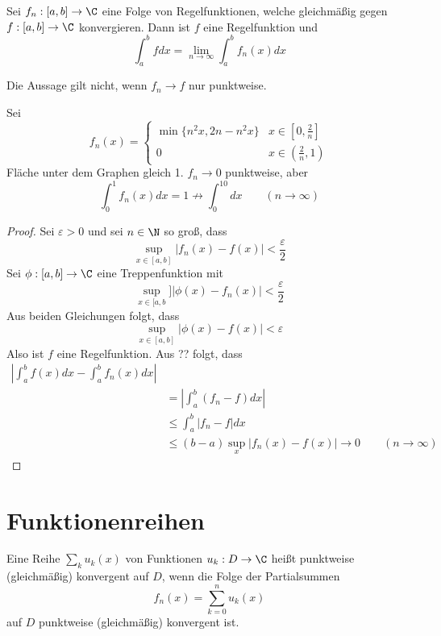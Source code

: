 \documentclass[a4paper,10pt]{scrbook}
\begin{document}
\begin{thm}
Sei $f_n:[a,b]\to\C$ eine Folge von Regelfunktionen, welche gleichmäßig gegen $f:[a,b]\to\C$ konvergieren. Dann ist $f$ eine Regelfunktion und
\[
\int_a^bfdx=\lim_{n\to\infty}\int_a^bf_n(x)dx
\]
\begin{note}
Die Aussage gilt nicht, wenn $f_n\to f$ nur punktweise.
\end{note}
\begin{ex*}
Sei
\[
f_n(x)=\begin{cases}
\min\{n^2x,2n-n^2x\}&x\in[0,\frac 2n]\\
0&x\in (\frac 2n, 1)
\end{cases}
\]
Fläche unter dem Graphen gleich 1. $f_n\to 0$ punktweise, aber
\[
\int_0^1f_n(x)dx=1\not\to \int_0^10dx \qquad (n\to\infty)
\]
\end{ex*}
\begin{proof}
Sei $\varepsilon>0$ und sei $n\in\N$ so groß, dass
\[
\sup_{x\in[a,b]}|f_n(x)-f(x)|<\frac{\varepsilon}2
\]
Sei $\phi:[a,b]\to\C$ eine Treppenfunktion mit
\[
\sup_{x\in[a,b}]|\phi(x)-f_n(x)|<\frac{\varepsilon}2
\]
Aus beiden Gleichungen folgt, dass
\[
\sup_{x\in[a,b]}|\phi(x)-f(x)|<\varepsilon
\]
Also ist $f$ eine Regelfunktion.
Aus ?? folgt, dass
\begin{align*}
|\int_a^bf(x)dx-\int_a^bf_n(x)dx|\\
&=|\int_a^b(f_n-f)dx|\\
&\le\int_a^b|f_n-f|dx\\
&\le(b-a)\sup_x|f_n(x)-f(x)|\to 0\qquad (n\to\infty)
\end{align*}
\end{proof}
\end{thm}

\section{Funktionenreihen}

Eine Reihe $\sum_ku_k(x)$ von Funktionen $u_k:D\to\C$ heißt punktweise (gleichmäßig) konvergent auf $D$, wenn die Folge der Partialsummen
\[
f_n(x)=\sum_{k=0}^nu_k(x)
\]
auf $D$ punktweise (gleichmäßig) konvergent ist.
\end{document}
